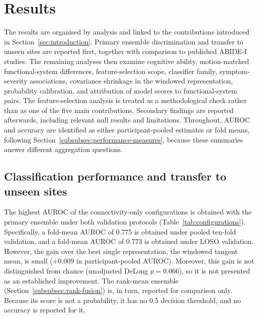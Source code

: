\section{Results}
\label{sec:results}

The results are organised by analysis and linked to the contributions introduced in Section~\ref{sec:introduction}. Primary ensemble discrimination and transfer to unseen sites are reported first, together with comparison to published ABIDE-I studies. The remaining analyses then examine cognitive ability, motion-matched functional-system differences, feature-selection scope, classifier family, symptom-severity associations, covariance shrinkage in the windowed representation, probability calibration, and attribution of model scores to functional-system pairs. The feature-selection analysis is treated as a methodological check rather than as one of the five main contributions. Secondary findings are reported afterwards, including relevant null results and limitations. Throughout, AUROC and accuracy are identified as either participant-pooled estimates or fold means, following Section~\ref{subsubsec:performance-measures}, because these summaries answer different aggregation questions.

\subsection{Classification performance and transfer to unseen sites}
\label{subsec:results-performance}

The highest AUROC of the connectivity-only configurations is obtained with the primary
ensemble under both validation protocols (Table~\ref{tab:configurations}). Specifically, a
fold-mean AUROC of 0.775 is obtained under pooled ten-fold validation, and a fold-mean
AUROC of 0.773 is obtained under LOSO validation. However, the gain over the
best single representation, the windowed tangent mean, is small ($+0.009$ in
participant-pooled AUROC).
Moreover, this gain is not distinguished from chance (unadjusted DeLong $p=0.066$), so it
is not presented as an established improvement. The rank-mean ensemble
(Section~\ref{subsubsec:rank-fusion}) is, in turn, reported for comparison only. Because its score is
not a probability, it has no 0.5 decision threshold, and no accuracy is reported for it.

